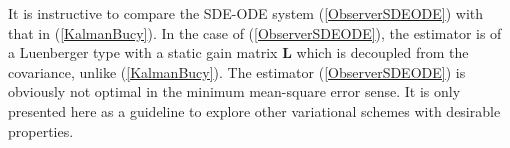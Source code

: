 \documentclass[letterpaper,10pt,twocolumn,conference]{ieeeconf}
\newcommand{\bbc}{\bm{c}}
\newcommand{\bbx}{{\bm{x}}}
\newcommand{\bby}{{\bm{y}}}
\newcommand{\bbmu}{\bm{\mu}}
\newcommand{\bbP}{\bm{P}}
\newcommand{\bbR}{\bm{R}}
\newcommand{\bbL}{\bm{L}}
\begin{document}
It is instructive to compare the SDE-ODE system (\ref{ObserverSDEODE}) with that in (\ref{KalmanBucy}). In the case of (\ref{ObserverSDEODE}), the estimator is of a Luenberger type with a static gain matrix $\bbL$ which is decoupled from the covariance, unlike (\ref{KalmanBucy}). The estimator (\ref{ObserverSDEODE}) is obviously not optimal in the minimum mean-square error sense. It is only presented here as a guideline to explore other variational schemes with desirable properties.

%
%
\end{document}
